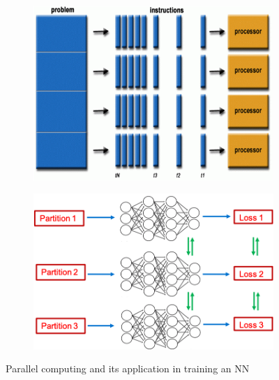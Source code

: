 \begin{figure}[!h]
        \begin{center}
	\begin{subfigure}{0.45\linewidth}
		\centering
		\includegraphics[width=\linewidth]{parallel_fig/parallel1.png}
	\end{subfigure}
	\begin{subfigure}{0.45\linewidth}
		\centering
		\includegraphics[width=\linewidth]{parallel_fig/parallel2.png}
	\end{subfigure}
	\caption{Parallel computing and its application in training an NN}
	\label{fig: parallel}
        \end{center}
\end{figure}